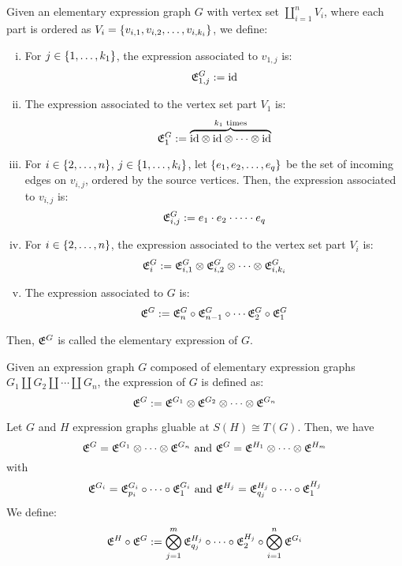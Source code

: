 \documentclass[./Thick_TQFTs_and_Quantum_Information.tex]{subfiles}
\begin{document}
\begin{defn}
Given an elementary expression graph $G$ with vertex set
$\coprod_{i = 1}^{n} V_i$, where each part is ordered as
$V_i = \set{v_{i, 1}, v_{i, 2}, \dots, v_{i, k_i}}$, we define:
\begin{enumerate}[(i)]
\setlength{\itemsep}{0pt}

\item For $j \in \set{1, \dots, k_1}$, the expression associated to $v_{1, j}$
is:
\[
  \mathfrak{E}^{G}_{1, j} := \text{id}
\]

\item The expression associated to the vertex set part $V_1$ is:
\[
  \mathfrak{E}^{G}_1 := \overbrace{\text{id} \otimes \text{id} \otimes \cdots
                          \otimes \text{id}}^{k_1 \text{ times}}
\]

\item For
$i \in \set{2, \dots, n}$,
$j \in \set{1, \dots, k_i}$,
let $\set{e_1, e_2, \dots, e_q}$ be the set of incoming edges on $v_{i, j}$,
ordered by the source vertices. Then, the expression associated to $v_{i, j}$
is:
\[
  \mathfrak{E}^{G}_{i, j} := e_1 \cdot e_2 \cdot \cdots \cdot e_q
\]

\item For $i \in \set{2, \dots, n}$, the expression associated to the vertex set
part $V_{i}$ is:
\[
  \mathfrak{E}^{G}_{i} := \mathfrak{E}^{G}_{i, 1} \otimes \mathfrak{E}^{G}_{i, 2} \otimes \cdots
                 \otimes \mathfrak{E}^{G}_{i, k_{i}}
\]

\item The expression associated to $G$ is:
\[
  \mathfrak{E}^{G} := \mathfrak{E}^{G}_n \circ \mathfrak{E}^{G}_{n - 1} \circ \cdots \mathfrak{E}^{G}_{2}
            \circ \mathfrak{E}^{G}_1
\]

\end{enumerate}

Then, $\mathfrak{E}^{G}$ is called the elementary expression of $G$.
\end{defn}

\begin{defn}[Expression]
Given an expression graph $G$ composed of elementary expression graphs
$G_1 \amalg G_2 \amalg \cdots \amalg G_n$, the expression of $G$ is defined as:
\[
  \mathfrak{E}^{G} := \mathfrak{E}^{G_1} \otimes \mathfrak{E}^{G_2} \otimes \cdots \otimes \mathfrak{E}^{G_n}
\]
\end{defn}

\begin{defn}
Let $G$ and $H$ expression graphs gluable at $S(H) \cong T(G)$. Then, we have
\[
  \mathfrak{E}^{G} = \mathfrak{E}^{G_1} \otimes \cdots \otimes \mathfrak{E}^{G_n} \text{ and }
  \mathfrak{E}^{G} = \mathfrak{E}^{H_1} \otimes \cdots \otimes \mathfrak{E}^{H_m}
\]
with
\[
  \mathfrak{E}^{G_i} = \mathfrak{E}^{G_i}_{p_i} \circ \cdots \circ \mathfrak{E}^{G_i}_{1} \text{ and }
  \mathfrak{E}^{H_j} = \mathfrak{E}^{H_j}_{q_j} \circ \cdots \circ \mathfrak{E}^{H_j}_{1}
\]
We define:
\[
  \mathfrak{E}^{H} \circ \mathfrak{E}^{G} :=
    \bigotimes_{j = 1}^{m} \mathfrak{E}^{H_j}_{q_j} \circ \cdots \circ \mathfrak{E}^{H_j}_{2}
    \circ \bigotimes_{i = 1}^{n} \mathfrak{E}^{G_i}
\]
\end{defn}
\end{document}
